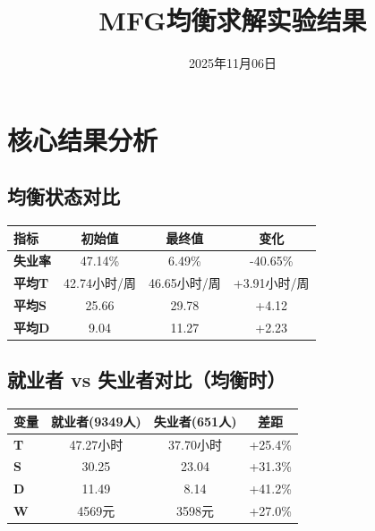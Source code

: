 \documentclass[12pt,a4paper]{article}
\title{\textbf{MFG均衡求解实验结果}}
\author{}
\date{2025年11月06日}
\begin{document}
\maketitle

\section{核心结果分析}

\subsection{均衡状态对比}

\begin{table}[htbp]
\centering
\begin{tabular}{lccc}
\toprule
\textbf{指标} & \textbf{初始值} & \textbf{最终值} & \textbf{变化} \\
\midrule
\textbf{失业率} & 47.14\% & 6.49\% & -40.65\% \\
\textbf{平均T} & 42.74小时/周 & 46.65小时/周 & +3.91小时/周 \\
\textbf{平均S} & 25.66 & 29.78 & +4.12 \\
\textbf{平均D} & 9.04 & 11.27 & +2.23 \\
\bottomrule
\end{tabular}
\end{table}

\subsection{就业者 vs 失业者对比（均衡时）}

\begin{table}[htbp]
\centering
\begin{tabular}{lccc}
\toprule
\textbf{变量} & \textbf{就业者(9349人)} & \textbf{失业者(651人)} & \textbf{差距} \\
\midrule
\textbf{T} & 47.27小时 & 37.70小时 & +25.4\% \\
\textbf{S} & 30.25 & 23.04 & +31.3\% \\
\textbf{D} & 11.49 & 8.14 & +41.2\% \\
\textbf{W} & 4569元 & 3598元 & +27.0\% \\
\bottomrule
\end{tabular}
\end{table}
\end{document}
